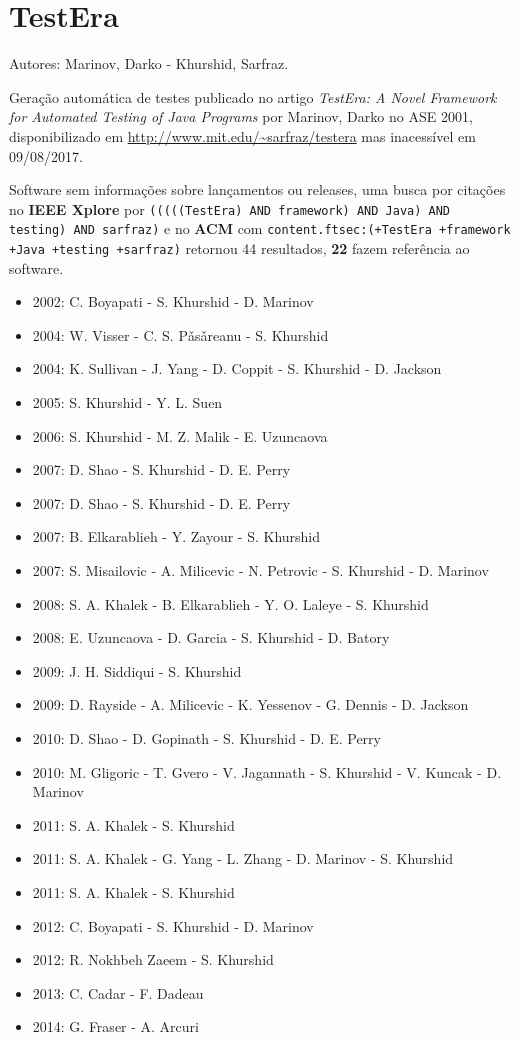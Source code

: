 \section{TestEra}

Autores:
Marinov, Darko - Khurshid, Sarfraz.

Geração automática de testes
publicado no artigo {\it TestEra: A Novel Framework for Automated Testing of Java Programs}
por Marinov, Darko
no ASE 2001,
disponibilizado em \url{http://www.mit.edu/~sarfraz/testera}
mas inacessível em 09/08/2017.

Software sem informações sobre lançamentos ou releases,
uma busca por citações no {\bf IEEE Xplore} por
\texttt{(((((TestEra) AND framework) AND Java) AND testing) AND sarfraz)}
e no {\bf ACM} com
\texttt{content.ftsec:(+TestEra +framework +Java +testing +sarfraz)}
retornou
44 resultados,
{\bf 22} fazem referência ao software.

\begin{itemize}
\item 2002: C. Boyapati - S. Khurshid - D. Marinov
\item 2004: W. Visser - C. S. P\v{a}s\v{a}reanu - S. Khurshid
\item 2004: K. Sullivan - J. Yang - D. Coppit - S. Khurshid - D. Jackson
\item 2005: S. Khurshid - Y. L. Suen
\item 2006: S. Khurshid - M. Z. Malik - E. Uzuncaova
\item 2007: D. Shao - S. Khurshid - D. E. Perry
\item 2007: D. Shao - S. Khurshid - D. E. Perry
\item 2007: B. Elkarablieh - Y. Zayour - S. Khurshid
\item 2007: S. Misailovic - A. Milicevic - N. Petrovic - S. Khurshid - D. Marinov
\item 2008: S. A. Khalek - B. Elkarablieh - Y. O. Laleye - S. Khurshid
\item 2008: E. Uzuncaova - D. Garcia - S. Khurshid - D. Batory
\item 2009: J. H. Siddiqui - S. Khurshid
\item 2009: D. Rayside - A. Milicevic - K. Yessenov - G. Dennis - D. Jackson
\item 2010: D. Shao - D. Gopinath - S. Khurshid - D. E. Perry
\item 2010: M. Gligoric - T. Gvero - V. Jagannath - S. Khurshid - V. Kuncak - D. Marinov
\item 2011: S. A. Khalek - S. Khurshid
\item 2011: S. A. Khalek - G. Yang - L. Zhang - D. Marinov - S. Khurshid
\item 2011: S. A. Khalek - S. Khurshid
\item 2012: C. Boyapati - S. Khurshid - D. Marinov
\item 2012: R. Nokhbeh Zaeem - S. Khurshid
\item 2013: C. Cadar - F. Dadeau
\item 2014: G. Fraser - A. Arcuri
\end{itemize}

